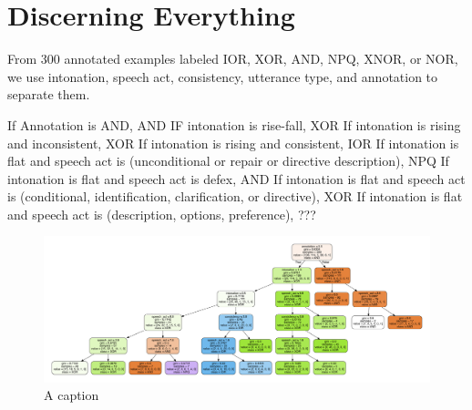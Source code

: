 \documentclass[oneside]{report}
\theoremstyle{definition}
\theoremstyle{definition}
\theoremstyle{definition}
\theoremstyle{remark}
\begin{document}
\section{Discerning Everything}\label{discerning-everything}

From 300 annotated examples labeled IOR, XOR, AND, NPQ, XNOR, or NOR, we
use intonation, speech act, consistency, utterance type, and annotation
to separate them. \newline

If Annotation is AND, AND \newline
IF intonation is rise-fall, XOR \newline
If intonation is rising and inconsistent, XOR \newline
If intonation is rising and consistent, IOR \newline
If intonation is flat and speech act is (unconditional or repair or
directive description), NPQ \newline
If intonation is flat and speech act is defex, AND \newline
If intonation is flat and speech act is (conditional, identification,
clarification, or directive), XOR \newline
If intonation is flat and speech act is (description, options,
preference), ??? \newline
\begin{figure}[tb]
\includegraphics[width=0.9\linewidth]{decision_trees/plots/everything} \caption{A caption}\label{fig:everyTree}
\end{figure}
\end{document}
